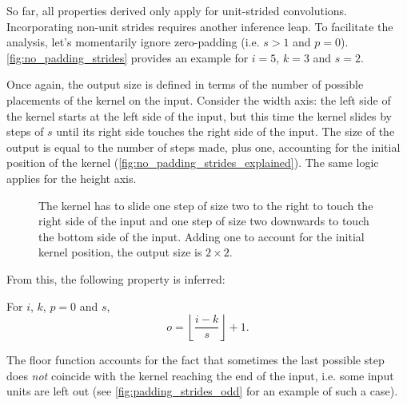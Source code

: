 \documentclass{article}
\begin{document}
So far, all properties derived only apply for unit-strided convolutions.
Incorporating non-unit strides requires another inference leap. To facilitate
the analysis, let's momentarily ignore zero-padding (i.e.  $s > 1$ and $p = 0$).
\autoref{fig:no_padding_strides} provides an example for $i = 5$, $k = 3$ and $s
= 2$.

Once again, the output size is defined in terms of the number of possible
placements of the kernel on the input. Consider the width axis: the left side of
the kernel starts at the left side of the input, but this time the kernel slides
by steps of $s$ until its right side touches the right side of the input. The
size of the output is equal to the number of steps made, plus one, accounting
for the initial position of the kernel
(\autoref{fig:no_padding_strides_explained}). The same logic applies for the
height axis.

\begin{figure}[h]
    \centering
    \caption{\label{fig:no_padding_strides_explained} The kernel has to slide
        one step of size two to the right to touch the right side of the input
        and one step of size two downwards to touch the bottom side of the
        input. Adding one to account for the initial kernel position, the output
        size is $2 \times 2$.}
\end{figure}

From this, the following property is inferred:

\begin{prop}\label{prop:no_padding_strides}
For $i$, $k$, $p = 0$ and $s$,
\begin{equation*}
    o = \left\lfloor \frac{i - k}{s} \right\rfloor + 1.
\end{equation*}
\end{prop}

The floor function accounts for the fact that sometimes the last possible step
does {\em not} coincide with the kernel reaching the end of the input, i.e.
some input units are left out (see \autoref{fig:padding_strides_odd} for an
example of such a case).
\end{document}
